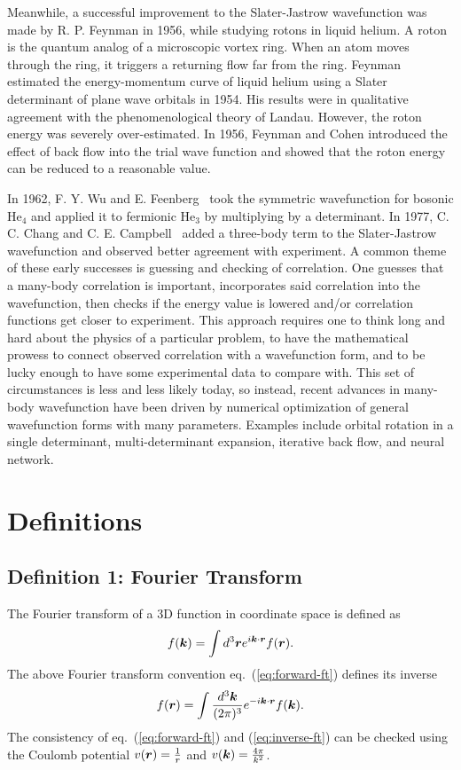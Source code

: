 Meanwhile, a successful improvement to the Slater-Jastrow wavefunction was made by R. P. Feynman in 1956, while studying rotons in liquid helium. A roton is the quantum analog of a microscopic vortex ring. When an atom moves through the ring, it triggers a returning flow far from the ring. Feynman estimated the energy-momentum curve of liquid helium using a Slater determinant of plane wave orbitals in 1954. His results were in qualitative agreement with the phenomenological theory of Landau. However, the roton energy was severely over-estimated. In 1956, Feynman and Cohen introduced the effect of back flow into the trial wave function and showed that the roton energy can be reduced to a reasonable value.

In 1962, F. Y. Wu and E. Feenberg~\cite{Wu1962} took the symmetric wavefunction for bosonic He$_4$ and applied it to fermionic He$_3$ by multiplying by a determinant.
In 1977, C. C. Chang and C. E. Campbell~\cite{Chang1977} added a three-body term to the Slater-Jastrow wavefunction and observed better agreement with experiment.
A common theme of these early successes is guessing and checking of correlation. One guesses that a many-body correlation is important, incorporates said correlation into the wavefunction, then checks if the energy value is lowered and/or correlation functions get closer to experiment. This approach requires one to think long and hard about the physics of a particular problem, to have the mathematical prowess to connect observed correlation with a wavefunction form, and to be lucky enough to have some experimental data to compare with. This set of circumstances is less and less likely today, so instead, recent advances in many-body wavefunction have been driven by numerical optimization of general wavefunction forms with many parameters. Examples include orbital rotation in a single determinant, multi-determinant expansion, iterative back flow, and neural network.

\section{Definitions}

\subsection{Definition 1: Fourier Transform}
The Fourier transform of a 3D function in coordinate space is defined as
\begin{align}
f(\boldsymbol{k}) = \int d^3\boldsymbol{r} e^{i\boldsymbol{k}\cdot\boldsymbol{r}} f(\boldsymbol{r}). \label{eq:forward-ft}
\end{align}
The above Fourier transform convention eq.~(\ref{eq:forward-ft}) defines its inverse
\begin{align}
f(\boldsymbol{r}) = \int \frac{d^3\boldsymbol{k}}{(2\pi)^3} e^{-i\boldsymbol{k}\cdot\boldsymbol{r}} f(\boldsymbol{k}). \label{eq:inverse-ft}
\end{align}
The consistency of eq.~(\ref{eq:forward-ft}) and (\ref{eq:inverse-ft}) can be checked using the Coulomb potential $v(\boldsymbol{r})=\frac{1}{r}$ and $v(\boldsymbol{k})=\frac{4\pi}{k^2}$. 

